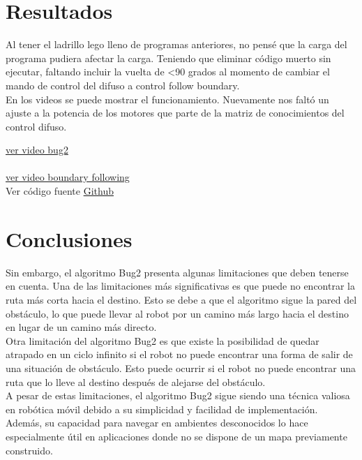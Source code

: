 \documentclass[oneside,onecolumn]{article}
\begin{document}
\newpage
\section{Resultados}

Al tener el ladrillo lego lleno de programas anteriores, no pensé que la carga del programa pudiera afectar la carga. Teniendo que eliminar código muerto sin ejecutar, faltando incluir la vuelta de <90 grados al momento de cambiar el mando de control del difuso a control follow boundary.\\

En los videos se puede mostrar el funcionamiento. Nuevamente nos faltó un ajuste a la potencia de los motores que parte de la matriz de conocimientos del control difuso.

\href{https://youtube.com/shorts/-L_p_NdpnfI?feature=share}{ver video bug2}\\\\
\href{https://youtube.com/shorts/Cbl7oi2yMPU?feature=share}{ver video boundary following}\\

Ver código fuente \href{https://github.com/luisballado/MobileRobotics/blob/main/codes/fuzzy.nxc}{Github}
\section{Conclusiones}

Sin embargo, el algoritmo Bug2 presenta algunas limitaciones que deben tenerse en cuenta. Una de las limitaciones más significativas es que puede no encontrar la ruta más corta hacia el destino. Esto se debe a que el algoritmo sigue la pared del obstáculo, lo que puede llevar al robot por un camino más largo hacia el destino en lugar de un camino más directo.\\

Otra limitación del algoritmo Bug2 es que existe la posibilidad de quedar atrapado en un ciclo infinito si el robot no puede encontrar una forma de salir de una situación de obstáculo. Esto puede ocurrir si el robot no puede encontrar una ruta que lo lleve al destino después de alejarse del obstáculo.\\

A pesar de estas limitaciones, el algoritmo Bug2 sigue siendo una técnica valiosa en robótica móvil debido a su simplicidad y facilidad de implementación. Además, su capacidad para navegar en ambientes desconocidos lo hace especialmente útil en aplicaciones donde no se dispone de un mapa previamente construido.\\
\end{document}
